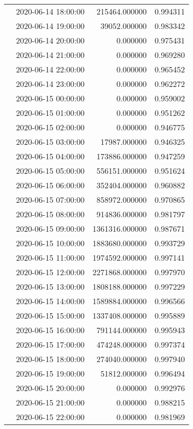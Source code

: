 \begin{tabular}{llrr}
 & 2020-06-14 18:00:00 & 215464.000000 & 0.994311 \\
 & 2020-06-14 19:00:00 & 39052.000000 & 0.983342 \\
 & 2020-06-14 20:00:00 & 0.000000 & 0.975431 \\
 & 2020-06-14 21:00:00 & 0.000000 & 0.969280 \\
 & 2020-06-14 22:00:00 & 0.000000 & 0.965452 \\
 & 2020-06-14 23:00:00 & 0.000000 & 0.962272 \\
 & 2020-06-15 00:00:00 & 0.000000 & 0.959002 \\
 & 2020-06-15 01:00:00 & 0.000000 & 0.951262 \\
 & 2020-06-15 02:00:00 & 0.000000 & 0.946775 \\
 & 2020-06-15 03:00:00 & 17987.000000 & 0.946325 \\
 & 2020-06-15 04:00:00 & 173886.000000 & 0.947259 \\
 & 2020-06-15 05:00:00 & 556151.000000 & 0.951624 \\
 & 2020-06-15 06:00:00 & 352404.000000 & 0.960882 \\
 & 2020-06-15 07:00:00 & 858972.000000 & 0.970865 \\
 & 2020-06-15 08:00:00 & 914836.000000 & 0.981797 \\
 & 2020-06-15 09:00:00 & 1361316.000000 & 0.987671 \\
 & 2020-06-15 10:00:00 & 1883680.000000 & 0.993729 \\
 & 2020-06-15 11:00:00 & 1974592.000000 & 0.997141 \\
 & 2020-06-15 12:00:00 & 2271868.000000 & 0.997970 \\
 & 2020-06-15 13:00:00 & 1808188.000000 & 0.997229 \\
 & 2020-06-15 14:00:00 & 1589884.000000 & 0.996566 \\
 & 2020-06-15 15:00:00 & 1337408.000000 & 0.995889 \\
 & 2020-06-15 16:00:00 & 791144.000000 & 0.995943 \\
 & 2020-06-15 17:00:00 & 474248.000000 & 0.997374 \\
 & 2020-06-15 18:00:00 & 274040.000000 & 0.997940 \\
 & 2020-06-15 19:00:00 & 51812.000000 & 0.996494 \\
 & 2020-06-15 20:00:00 & 0.000000 & 0.992976 \\
 & 2020-06-15 21:00:00 & 0.000000 & 0.988215 \\
 & 2020-06-15 22:00:00 & 0.000000 & 0.981969 \\

\end{tabular}
